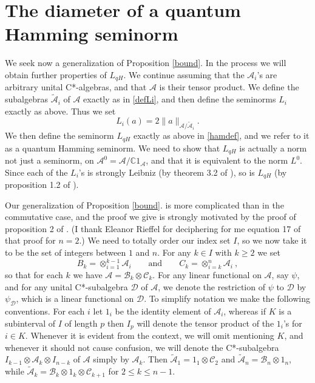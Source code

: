 \documentclass{amsart}[14pt]
\theoremstyle{definition}
\theoremstyle{remark}
\newcommand{\cA}{{\mathcal A}}
\newcommand{\cB}{{\mathcal B}}
\newcommand{\cC}{{\mathcal C}}
\newcommand{\cD}{{\mathcal D}}
\newcommand{\bC}{{\mathbb C}}
\newcommand{\<}{\langle}
\renewcommand{\>}{\rangle}
\numberwithin{equation}{section}
\begin{document}
{%

\section{The diameter of a quantum Hamming seminorm}
\label{hams}

We seek now a generalization of Proposition \ref{bound}. 
In the process we will obtain further properties of $L_{qH}$. 
We continue assuming that  the $\cA_i$'s 
are arbitrary unital C*-algebras,
and that $\cA$ is their tensor product.  We define the subalgebras
$\tilde \cA_i$ of $\cA$ exactly as in \ref{defLi}, and then define the
seminorms $L_i$ exactly as above. Thus we set
\[
L_i(a) = 2\|a\|_{\cA/\tilde \cA_i }   .
\]
We then define the seminorm
$L_{qH}$ exactly as above in \ref{hamdef}, and we refer to it as a 
quantum Hamming seminorm. We need to show that $L_{qH}$
is actually a norm not just a seminorm, on $\cA^0 = \cA/\bC 1_\cA$,
and that it is equivalent to the norm $L^0$.   
Since each of the $L_i$'s is strongly Leibniz (by theorem 3.2
of \cite{R24}), so is $L_{qH}$ (by proposition 1.2 of \cite{R21}).

Our generalization of Proposition \ref{bound}.
is more complicated than in the commutative case, and the
proof we give is strongly motivated by the proof of proposition 2 of \cite{DMTL}. 
(I thank Eleanor Rieffel for deciphering for me equation 17 of that
proof for $n=2$.) We need to totally order our index set $I$, so we now
take it to be the set of integers between $1$ and $n$.
For any $k \in I$ with $k \geq 2$ we set 
\[
B_k = \otimes _{i=1}^{k-1} \cA_i \quad \quad \mathrm{and} \quad 
\quad  C_k = \otimes _{i=k}^n \cA_i   \ ,
\]   
so that for each $k$ we have
$\cA = \cB_k \otimes \cC_k$. 
For any linear functional on $\cA$, say $\psi$, 
and for any unital C*-subalgebra $\cD$ of 
$\cA$, we denote the restriction of $\psi$ to $\cD$ by $\psi_\cD$, 
which is a linear functional on $\cD$.
To simplify notation we make the following conventions. For each $i$ let $1_i$
be the identity element of $\cA_i$, whereas if $K$ is a subinterval of $I$
of length $p$ then $I_p$ will denote the tensor product of the $1_i$'s for
$i \in K$. Whenever it is evident from the context, we will omit mentioning $K$,
and whenever it should not cause confusion, we will denote the C*-subalgebra
$I_{k-1} \otimes \cA_k \otimes I_{n-k}$ of $\cA$ simply by $\cA_k$. Then
$\tilde \cA_1 = 1_1 \otimes \cC_{2}$ and $\tilde \cA_n =  \cB_n \otimes 1_n$,
while $\tilde \cA_k =   \cB_k \otimes 1_k \otimes \cC_{k+1}$ for $2 \leq k \leq n-1$.

}
\end{document}
